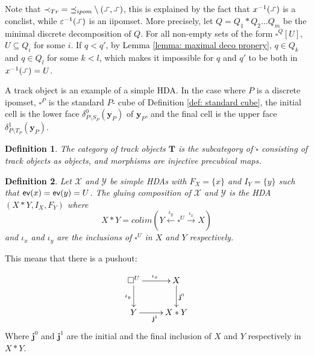 \documentclass[11pt,a4paper,oldfontcommands]{memoir}
\newcommand*\ev{\textup{\textsf{ev}}}
\newcommand{\TrO}{\mathbf{T}}
\newcommand*\exec{%
  \raisebox{1pt}{%
    \begin{tikzpicture}[x=.8ex,y=1ex,-]
      \draw (0,0) -- (1,0) -- (1,1) -- (2,1);
    \end{tikzpicture}}}
\newcommand*\pobj[1]{\square^{#1}}
\newtheorem{definition}{Definition}
\begin{document}
Note that ${\prec_{Tr}}={\preceq_{ipom}} \setminus (\exec,\exec)$, this is explained by the fact that $x^{-1}(\exec)$ is a conclist, while $\varepsilon^{-1}(\exec)$ is an iipomset. More precisely, let $Q=Q_1*Q_2 \dots Q_m$ be the minimal discrete decomposition of $Q$. For all non-empty sets of the form $\square^Q[U]$, $U\subseteq Q_i$ for some $i$. If $q<q'$, by Lemma \ref{lemma: maximal deco propery}, $q\in Q_k$ and $q\in Q_l$ for some $k<l$, which makes it impossible for $q$ and $q'$ to be both in $x^{-1}(\exec)=U$.

A track object is an example of a simple HDA. In the case where $P$ is a discrete ipomset, $ \pobj{ P}$ is the standard $P$- cube of Definition \ref{def: standard cube}, the initial cell is the lower face $\delta^0_{P \setminus S_P}(\mathbf{y}_P)$ of $\mathbf{y}_P$, and the final cell is the upper face $\delta^1_{P \setminus T_P}(\mathbf{y}_P)$. 

\begin{definition}\label{def: track obj category}
The category of track objects $\TrO$ is the subcategory of $\widehat{\square}$ consisting of track objects as objects, and morphisms are injective precubical maps. 
    
\end{definition}

\begin{definition}
   Let $\mathcal{X}$ and $\mathcal{Y}$ be simple HDAs with $F_X=\{ x \}$ and $I_Y=\{ y \}$ such that $\ev(x)=\ev(y)=U$. The gluing composition of $\mathcal{X}$ and $\mathcal{Y}$ is the HDA $(X*Y, I_{X}, F_{Y} )$ where $$X*Y=colim(Y\stackrel{\iota_y}{\longleftarrow} \square^U \stackrel{\iota_x}{\longrightarrow} X )$$ 
   and $\iota_x$ and $\iota_y$ are the inclusions of $\square^U$ in $X$ and $Y$ respectively.

\end{definition}


This means that there is a pushout:  

 \begin{equation*} 
    \xymatrix{%
      \square^{U} \ar[r]^{\iota_x}
      \ar[d]_{\iota_y} \ar@{}[dr] &
      X \ar[d]^{\mathbf{j}^0} \\
      Y \ar[r]_{\mathbf{j}^1}   & X*Y  
    }
  \end{equation*}
Where $\mathbf{j}^0_{}$ and $\mathbf{j}^1_{}$ are the initial and the final inclusion of $X$ and $Y$ respectively in $X*Y$.
\end{document}
